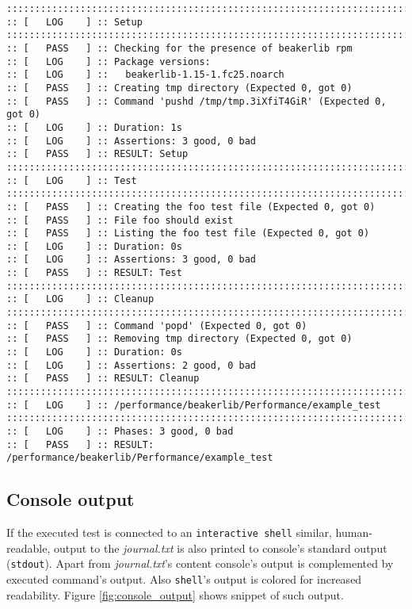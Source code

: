 \begin{minipage}{\linewidth}
\begin{lstlisting}[style=txt,caption={Example of journal.txt},label={lst:journaltxt_example}]
::::::::::::::::::::::::::::::::::::::::::::::::::::::::::::::::::::::::::::::::
:: [   LOG    ] :: Setup
::::::::::::::::::::::::::::::::::::::::::::::::::::::::::::::::::::::::::::::::
:: [   PASS   ] :: Checking for the presence of beakerlib rpm 
:: [   LOG    ] :: Package versions:
:: [   LOG    ] ::   beakerlib-1.15-1.fc25.noarch
:: [   PASS   ] :: Creating tmp directory (Expected 0, got 0)
:: [   PASS   ] :: Command 'pushd /tmp/tmp.3iXfiT4GiR' (Expected 0, got 0)
:: [   LOG    ] :: Duration: 1s
:: [   LOG    ] :: Assertions: 3 good, 0 bad
:: [   PASS   ] :: RESULT: Setup
::::::::::::::::::::::::::::::::::::::::::::::::::::::::::::::::::::::::::::::::
:: [   LOG    ] :: Test
::::::::::::::::::::::::::::::::::::::::::::::::::::::::::::::::::::::::::::::::
:: [   PASS   ] :: Creating the foo test file (Expected 0, got 0)
:: [   PASS   ] :: File foo should exist 
:: [   PASS   ] :: Listing the foo test file (Expected 0, got 0)
:: [   LOG    ] :: Duration: 0s
:: [   LOG    ] :: Assertions: 3 good, 0 bad
:: [   PASS   ] :: RESULT: Test
::::::::::::::::::::::::::::::::::::::::::::::::::::::::::::::::::::::::::::::::
:: [   LOG    ] :: Cleanup
::::::::::::::::::::::::::::::::::::::::::::::::::::::::::::::::::::::::::::::::
:: [   PASS   ] :: Command 'popd' (Expected 0, got 0)
:: [   PASS   ] :: Removing tmp directory (Expected 0, got 0)
:: [   LOG    ] :: Duration: 0s
:: [   LOG    ] :: Assertions: 2 good, 0 bad
:: [   PASS   ] :: RESULT: Cleanup
::::::::::::::::::::::::::::::::::::::::::::::::::::::::::::::::::::::::::::::::
:: [   LOG    ] :: /performance/beakerlib/Performance/example_test
::::::::::::::::::::::::::::::::::::::::::::::::::::::::::::::::::::::::::::::::
:: [   LOG    ] :: Phases: 3 good, 0 bad
:: [   PASS   ] :: RESULT: /performance/beakerlib/Performance/example_test

\end{lstlisting}
\end{minipage}

\subsection{Console output}
\label{console_out}
If the executed test is connected to an \texttt{interactive shell} similar, human-readable, output to the \textit{journal.txt} is also printed to console's standard output (\texttt{stdout}). Apart from  \textit{journal.txt}'s content console's output is complemented by executed command's output. Also \texttt{shell}'s output is colored for increased readability.  Figure \ref{fig:console_output} shows snippet of such output.

